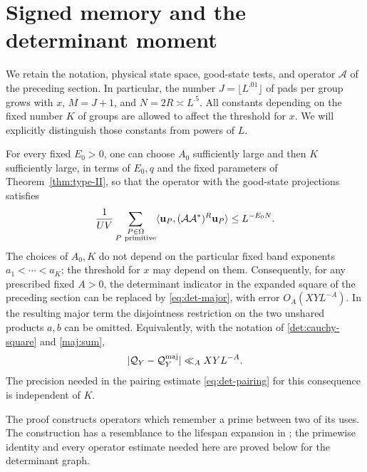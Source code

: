 \section{Signed memory and the determinant moment}
\label{mem:section}

We retain the notation, physical state space, good-state tests, and
operator $\mathcal A$ of the preceding section. In particular, the number
$J=\lfloor L^{.01}\rfloor$ of pads per group grows with $x$,
$M=J+1$, and $N=2R\asymp L^{.5}$. All constants depending on the fixed
number $K$ of groups are allowed to affect the threshold for $x$.
We will explicitly distinguish those constants from powers of $L$.

\begin{proposition}\label{prop:minor-moment}
For every fixed $E_0>0$, one can choose $A_0$ sufficiently large and then
$K$ sufficiently large, in terms of $E_0,q$ and the fixed parameters of
Theorem~\ref{thm:type-II}, so that the operator with the good-state
projections satisfies
\begin{equation}\label{mem:moment-bound}
 \frac{1}{UV}\sum_{\substack{P\in\Omega\\P\ \mathrm{primitive}}}
 \langle \mathbf u_P,(\mathcal A\mathcal A^*)^R\mathbf u_P\rangle
 \le L^{-E_0N}.
\end{equation}
The choices of $A_0,K$ do not depend on the particular fixed band
exponents $a_1<\cdots<a_K$; the threshold for $x$ may depend on them.
Consequently, for any prescribed fixed $A>0$, the determinant indicator
in the expanded square of the preceding section can be replaced by
\eqref{eq:det-major}, with error $O_A(XY L^{-A})$. In the resulting
major term the disjointness restriction on the two unshared products
$a,b$ can be omitted. Equivalently, with the notation of
\eqref{det:cauchy-square} and \eqref{maj:sum},
\begin{equation}\label{mem:replacement-interface}
 \lvert\mathcal Q_Y-\mathcal Q_Y^{\mathrm{maj}}\rvert
      \ll_A XY L^{-A}.
\end{equation}
The precision needed in the pairing estimate
\eqref{eq:det-pairing} for this consequence is independent of $K$.
\end{proposition}

The proof constructs operators which remember a prime between two of
its uses. The construction has a resemblance to the lifespan expansion
in \cite[Section~3]{SmoothShifted}; the primewise identity and every
operator estimate needed here are proved below for the determinant
graph.

